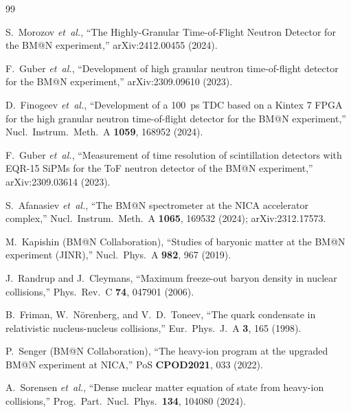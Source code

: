 \documentclass[aps,prc,twocolumn,superscriptaddress,showpacs,%
               nofootinbib,floatfix,longbibliography]{revtex4-2}
\begin{document}

\begin{thebibliography}{99}

  S.~Morozov \emph{et~al.},
  ``The Highly-Granular Time-of-Flight Neutron Detector for the BM@N
   experiment,''
  arXiv:2412.00455 (2024).

  F.~Guber \emph{et~al.},
  ``Development of high granular neutron time-of-flight detector for
   the BM@N experiment,''
  arXiv:2309.09610 (2023).

  D.~Finogeev \emph{et~al.},
  ``Development of a 100~ps TDC based on a Kintex 7 FPGA for the high
   granular neutron time-of-flight detector for the BM@N experiment,''
  Nucl.~Instrum.~Meth.~A \textbf{1059}, 168952 (2024).

  F.~Guber \emph{et~al.},
  ``Measurement of time resolution of scintillation detectors with
   EQR-15 SiPMs for the ToF neutron detector of the BM@N experiment,''
  arXiv:2309.03614 (2023).

  S.~Afanasiev \emph{et~al.},
  ``The BM@N spectrometer at the NICA accelerator complex,''
  Nucl.~Instrum.~Meth.~A \textbf{1065}, 169532 (2024);
  arXiv:2312.17573.

  M.~Kapishin (BM@N Collaboration),
  ``Studies of baryonic matter at the BM@N experiment (JINR),''
  Nucl.~Phys.~A \textbf{982}, 967 (2019).

  J.~Randrup and J.~Cleymans,
  ``Maximum freeze-out baryon density in nuclear collisions,''
  Phys.~Rev.~C \textbf{74}, 047901 (2006).

  B.~Friman, W.~N\"orenberg, and V.~D.~Toneev,
  ``The quark condensate in relativistic nucleus-nucleus collisions,''
  Eur.~Phys.~J.~A \textbf{3}, 165 (1998).

  P.~Senger (BM@N Collaboration),
  ``The heavy-ion program at the upgraded BM@N experiment at NICA,''
  PoS \textbf{CPOD2021}, 033 (2022).

  A.~Sorensen \emph{et~al.},
  ``Dense nuclear matter equation of state from heavy-ion collisions,''
  Prog.~Part.~Nucl.~Phys.~\textbf{134}, 104080 (2024).


\end{thebibliography}
\end{document}
